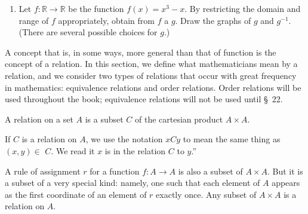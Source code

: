 \begin{enumerate}[itemsep=0.4em, parsep=0pt, topsep=0pt, partopsep=0pt, leftmargin=*, label=\arabic*., ref=\arabic*]
\begin{enumerate}[itemsep=0.2em, parsep=0pt, topsep=0pt, partopsep=0pt, leftmargin=*, label=(\alph*), align=left]
  \end{enumerate}
\item Let \(f : \mathbb{R} \rightarrow \mathbb{R}\) be the function \(f(x) = x^{3} - x\). By restricting the domain and range of \(f\) appropriately, obtain from \(f\) a  \(g\). Draw the graphs of \(g\) and \(g^{-1}\). (There are several possible choices for \(g\).)
\end{enumerate}


A concept that is, in some ways, more general than that of function is the concept 
of a relation. In this section, we define what mathematicians mean by a relation, 
and we consider two types of relations that occur with great frequency in mathematics: 
equivalence relations and order relations. Order relations will be used throughout the book; 
equivalence relations will not be used until \S\ 22.

\begin{definition}
 A relation on a set \(A\) is a subset \(C\) of the cartesian product \(A \times A\).
\end{definition}

If \(C\) is a relation on \(A\), we use the notation \({xCy}\) to mean the 
same thing as \(({x,y}) \in\) \(C\). We read it \(x\) 
is in the relation \(C\) to \(y\).''

A rule of assignment \(r\) for a function \(f : A \rightarrow A\) is also 
a subset of \(A \times A\). But it is a subset of a very special kind: namely, 
one such that each element of \(A\) appears as the first coordinate of an element 
of \(r\) exactly once. Any subset of \(A \times A\) is a relation on \(A\).

